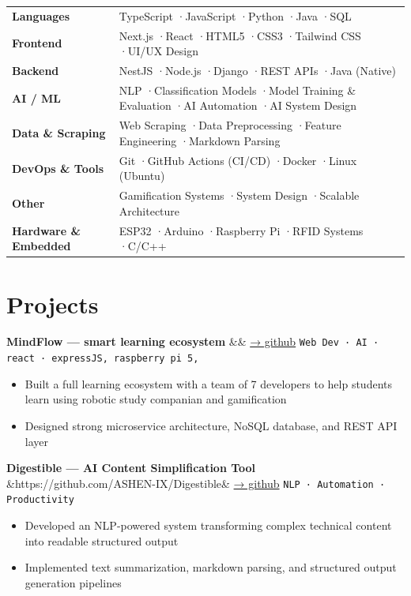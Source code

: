 \documentclass[10pt, a4paper]{article}
\newcommand{\projectentry}[3]{%
  \textbf{\color{navy}#1}%
  \ifx&#2&\else
    \enspace\href{#2}{\small\color{accent}→ github}%
  \fi
  \hfill \texttt{\footnotesize\color{muted}#3}%
}
\newcommand{\skillrow}[2]{%
  \textbf{\small\color{navy}#1} & {\small\color{black}#2}\\[2pt]%
}
\begin{document}
\begin{tabularx}{\textwidth}{@{} >{\raggedright\arraybackslash}p{3.0cm} X @{}}
  \skillrow{Languages}{TypeScript \enspace·\enspace JavaScript \enspace·\enspace Python \enspace·\enspace Java \enspace·\enspace SQL}
  \skillrow{Frontend}{Next.js \enspace·\enspace React \enspace·\enspace HTML5 \enspace·\enspace CSS3 \enspace·\enspace Tailwind CSS \enspace·\enspace UI/UX Design}
  \skillrow{Backend}{NestJS \enspace·\enspace Node.js \enspace·\enspace Django \enspace·\enspace REST APIs \enspace·\enspace Java (Native)}
  \skillrow{AI / ML}{NLP \enspace·\enspace Classification Models \enspace·\enspace Model Training \& Evaluation \enspace·\enspace AI Automation \enspace·\enspace AI System Design}
  \skillrow{Data \& Scraping}{Web Scraping \enspace·\enspace Data Preprocessing \enspace·\enspace Feature Engineering \enspace·\enspace Markdown Parsing}
  \skillrow{DevOps \& Tools}{Git \enspace·\enspace GitHub Actions (CI/CD) \enspace·\enspace Docker \enspace·\enspace Linux (Ubuntu)}
  \skillrow{Other}{Gamification Systems \enspace·\enspace System Design \enspace·\enspace Scalable Architecture}
  \skillrow{Hardware \& Embedded}{ESP32 \enspace·\enspace Arduino \enspace·\enspace Raspberry Pi \enspace·\enspace RFID Systems \enspace·\enspace C/C++}
\end{tabularx}

\section{Projects}

\projectentry{MindFlow — smart learning ecosystem}{}{Web Dev · AI · react · expressJS, raspberry pi 5, }
\begin{itemize}
  \item Built a full learning ecosystem with a team of 7 developers to help students learn using robotic study companian and gamification
  \item Designed strong microservice architecture, NoSQL database, and REST API layer
\end{itemize}

\vspace{3pt}
\projectentry{Digestible — AI Content Simplification Tool}{https://github.com/ASHEN-IX/Digestible}{NLP · Automation · Productivity}
\begin{itemize}
  \item Developed an NLP-powered system transforming complex technical content into readable structured output
  \item Implemented text summarization, markdown parsing, and structured output generation pipelines
\end{itemize}
\end{document}
